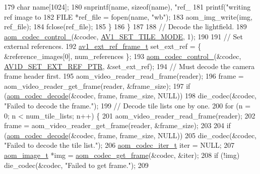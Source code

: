 \begin{DoxyCodeInclude}
{{{{179       \textcolor{keywordtype}{char} name[1024];
180       snprintf(name, \textcolor{keyword}{sizeof}(name), \textcolor{stringliteral}{"ref\_%
181       printf(\textcolor{stringliteral}{"writing ref image to %
182       FILE *ref\_file = fopen(name, \textcolor{stringliteral}{"wb"});
183       aom\_img\_write(img, ref\_file);
184       fclose(ref\_file);
185     \}
186   \}
187 
188   \textcolor{comment}{// Decode the lightfield.}
189   \hyperlink{group__codec_ga51eb332a40dcacc39000ab8e0be36b79}{aom\_codec\_control\_}(&codec, \hyperlink{group__aom__decoder_gga3865fd4b3192489baa9a5c3632ebe97ba0795d8084ae8c78528c01587198df9e2}{AV1\_SET\_TILE\_MODE}, 1);
190 
191   \textcolor{comment}{// Set external references.}
192   \hyperlink{structav1__ext__ref__frame}{av1\_ext\_ref\_frame\_t} set\_ext\_ref = \{ &reference\_images[0], num\_references \};
193   \hyperlink{group__codec_ga51eb332a40dcacc39000ab8e0be36b79}{aom\_codec\_control\_}(&codec, \hyperlink{group__aom__decoder_gga3865fd4b3192489baa9a5c3632ebe97badfbe6c1ebe4039bfef4d2cfd98755add}{AV1D\_SET\_EXT\_REF\_PTR}, &set\_ext\_ref);
194   \textcolor{comment}{// Must decode the camera frame header first.}
195   aom\_video\_reader\_read\_frame(reader);
196   frame = aom\_video\_reader\_get\_frame(reader, &frame\_size);
197   \textcolor{keywordflow}{if} (\hyperlink{group__decoder_gab03fdb999d1f83a5896869a3ba5f68f7}{aom\_codec\_decode}(&codec, frame, frame\_size, NULL))
198     die\_codec(&codec, \textcolor{stringliteral}{"Failed to decode the frame."});
199   \textcolor{comment}{// Decode tile lists one by one.}
200   \textcolor{keywordflow}{for} (n = 0; n < num\_tile\_lists; n++) \{
201     aom\_video\_reader\_read\_frame(reader);
202     frame = aom\_video\_reader\_get\_frame(reader, &frame\_size);
203 
204     \textcolor{keywordflow}{if} (\hyperlink{group__decoder_gab03fdb999d1f83a5896869a3ba5f68f7}{aom\_codec\_decode}(&codec, frame, frame\_size, NULL))
205       die\_codec(&codec, \textcolor{stringliteral}{"Failed to decode the tile list."});
206     \hyperlink{group__codec_gadf9e173c9e02788a9999399edab20a02}{aom\_codec\_iter\_t} iter = NULL;
207     \hyperlink{structaom__image}{aom\_image\_t} *img = \hyperlink{group__decoder_ga780aad27a2728abefab725faa3bc4f79}{aom\_codec\_get\_frame}(&codec, &iter);
208     \textcolor{keywordflow}{if} (!img) die\_codec(&codec, \textcolor{stringliteral}{"Failed to get frame."});
209 
}}}}}}
\end{DoxyCodeInclude}
